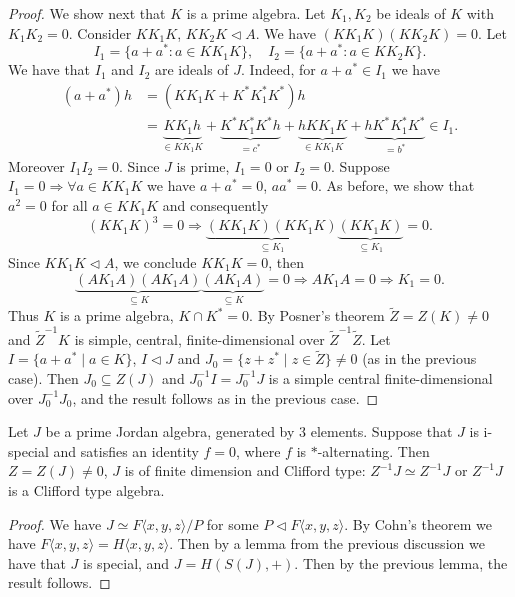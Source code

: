 \documentclass{article}
\begin{document}
\begin{proof}
We show next that $K$ is a prime algebra. Let $K_1, K_2$ be ideals of $K$ with $K_1K_2 = 0$. Consider $KK_1K$, $KK_2K \triangleleft A$. We have $(KK_1K)(KK_2K) = 0$. Let
\[
I_1 = \{ a + a^* : a \in KK_1K \}, \quad I_2 = \{ a + a^* : a \in KK_2K \}.
\]
We have that $I_1$ and $I_2$ are ideals of $J$. Indeed, for $a + a^* \in I_1$ we have
\begin{align*}
(a + a^*)h &= (KK_1K + K^*K_1^*K^*)h \\
&= \underbrace{KK_1h}_{\in KK_1K} + \underbrace{K^*K_1^*K^*h}_{=c^*} + \underbrace{hKK_1K}_{\in KK_1K} + \underbrace{hK^*K_1^*K^*}_{=b^*} \in I_1.
\end{align*}
Moreover $I_1I_2 = 0$. Since $J$ is prime, $I_1 = 0$ or $I_2 = 0$. Suppose $I_1 = 0 \Rightarrow \forall a \in KK_1K$ we have $a + a^* = 0$, $aa^* = 0$. As before, we show that $a^2 = 0$ for all $a \in KK_1K$ and consequently
\[
(KK_1K)^3 = 0 \Rightarrow \underbrace{(KK_1K)(KK_1K)}_{\subseteq K_1} \underbrace{(KK_1K)}_{\subseteq K_1} = 0.
\]
Since $KK_1K \triangleleft A$, we conclude $KK_1K = 0$, then
\[
\underbrace{(AK_1A)(AK_1A)}_{\subseteq K} \underbrace{(AK_1A)}_{\subseteq K} = 0 \Rightarrow AK_1A = 0 \Rightarrow K_1 = 0.
\]
Thus $K$ is a prime algebra, $K \cap K^* = 0$. By Posner's theorem $\widetilde{Z} = Z(K) \neq 0$ and $\widetilde{Z}^{-1}K$ is simple, central, finite-dimensional over $\widetilde{Z}^{-1}\widetilde{Z}$. Let $I = \{ a + a^* \mid a \in K \}$, $I \triangleleft J$ and $J_0 = \{ z + z^* \mid z \in \widetilde{Z} \} \neq 0$ (as in the previous case). Then $J_0 \subseteq Z(J)$ and $J_0^{-1}I = J_0^{-1}J$ is a simple central finite-dimensional over $J_0^{-1}J_0$, and the result follows as in the previous case.
\end{proof}

\begin{lemma}
Let $J$ be a prime Jordan algebra, generated by $3$ elements. Suppose that $J$ is i-special and satisfies an identity $f = 0$, where $f$ is $*$-alternating. Then $Z = Z(J) \neq 0$, $J$ is of finite dimension and Clifford type: $Z^{-1}J \simeq Z^{-1}J$ or $Z^{-1}J$ is a Clifford type algebra.
\end{lemma}

\begin{proof}
We have $J \simeq F\langle x, y, z \rangle / P$ for some $P \triangleleft F\langle x, y, z \rangle$. By Cohn's theorem we have $F\langle x, y, z \rangle = H\langle x, y, z \rangle$. Then by a lemma from the previous discussion we have that $J$ is special, and $J = H(S(J), +)$. Then by the previous lemma, the result follows.
\end{proof}
\end{document}
